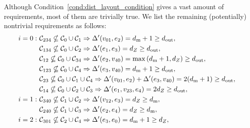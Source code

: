 \documentclass[
 prx,
 reprint,
 superscriptaddress,
 longbibliography,
 dvipsnames
]{revtex4-2}
\begin{document}
\begin{widetext}
Although Condition~\ref{cond:dist_layout_condition} gives a vast amount of requirements, most of them are trivially true.
We list the remaining (potentially) nontrivial requirements as follows:
\begin{subequations}
\begin{align}
    i=0:~ &\condsete{234} \nsubseteq \condsete{0} \cup \condsete{1} \Rightarrow \distprime{v_{01}, e_2} = \dm + 1 \geq \dout, \label{eq:dist_layout_req_i0_234} \\ 
    &\condsete{134} \nsubseteq \condsete{0} \cup \condsete{2} \Rightarrow \distprime{e_1, e_3} = \dz \geq \dout, \label{eq:dist_layout_req_i0_134} \\
    &\condsete{12} \nsubseteq \condsete{0} \cup \condsete{34} \Rightarrow \distprime{e_2, v_{40}} = \max\qty(\dm+1, \dz) \geq \dout, \label{eq:dist_layout_req_i0_12} \\
    &\condsete{123} \nsubseteq \condsete{0} \cup \condsete{4} \Rightarrow \distprime{e_3, v_{40}} = \dm + 1 \geq \dout, \label{eq:dist_layout_req_i0_123} \\
    &\condsete{23} \nsubseteq \condsete{0} \cup \condsete{1} \cup \condsete{4} \Rightarrow \distprime{v_{01}, e_2} + \distprime{e_3, v_{40}} = 2(\dm + 1) \geq \dout, \label{eq:dist_layout_req_i0_23} \\ 
    &\condsete{14} \nsubseteq \condsete{0} \cup \condsete{2} \cup \condsete{3} \Rightarrow \distprime{e_1, v_{23}, e_4} = 2\dz \geq \dout, \label{eq:dist_layout_req_i0_14} \\ 
    i=1:~
    &\condsete{340} \nsubseteq \condsete{1} \cup \condsete{2} \Rightarrow \distprime{v_{12}, e_3} = \dz \geq \dm, \label{eq:dist_layout_req_i1_340} \\ 
    &\condsete{240} \nsubseteq \condsete{1} \cup \condsete{3} \Rightarrow \distprime{e_2, e_4} = \dz \geq \dm, \label{eq:dist_layout_req_i1_240} \\ 
    i=2:~ &\condsete{301} \nsubseteq \condsete{2} \cup \condsete{4} \Rightarrow \distprime{e_3, e_0} = \dm + 1 \geq \dz, \label{eq:dist_layout_req_i2_301} \\ 

\end{align}
\end{subequations}
\end{widetext}
\end{document}
